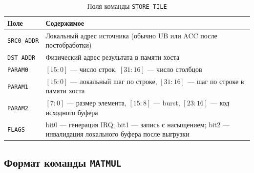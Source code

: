 \documentclass[12pt,a4paper]{article}
\begin{document}
\begin{table}[H]
    \centering
    \caption{Поля команды \texttt{STORE\_TILE}}
    \begin{tabular}{|L{2.6cm}|L{10.1cm}|}
        \hline
        \textbf{Поле} & \textbf{Содержимое} \\
        \hline
        \texttt{SRC0\_ADDR} & Локальный адрес источника (обычно UB или ACC после постобработки) \\
        \hline
        \texttt{DST\_ADDR} & Физический адрес результата в памяти хоста \\
        \hline
        \texttt{PARAM0} & \([15:0]\) --- число строк, \([31:16]\) --- число столбцов \\
        \hline
        \texttt{PARAM1} & \([15:0]\) --- локальный шаг по строке, \([31:16]\) --- шаг по строке в памяти хоста \\
        \hline
        \texttt{PARAM2} & \([7:0]\) --- размер элемента, \([15:8]\) --- burst, \([23:16]\) --- код исходного буфера \\
        \hline
        \texttt{FLAGS} & bit0 --- генерация IRQ; bit1 --- запись с насыщением; bit2 --- инвалидация локального буфера после выгрузки \\
        \hline
    \end{tabular}
\end{table}

\subsection{Формат команды \texttt{MATMUL}}
\end{document}
